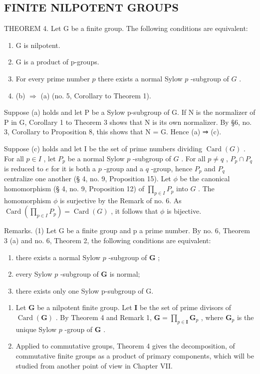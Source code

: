 \subsection{FINITE NILPOTENT GROUPS}

THEOREM 4. Let G be a finite group. The following conditions are equivalent:

\begin{enumerate}
\def\labelenumi{(\alph{enumi})}
\item
  G is nilpotent.
\item
  G is a product of p-groups.
\item
  For every prime number \(p\) there exists a normal Sylow \(p\) -subgroup of \(G\) .
\item
  (b) \(\Rightarrow\) (a) (no. 5, Corollary to Theorem 1).
\end{enumerate}

Suppose (a) holds and let P be a Sylow p-subgroup of G. If N is the normalizer of P in G, Corollary 1 to Theorem 3 shows that N is its own normalizer. By §6, no. 3, Corollary to Proposition 8, this shows that N = G. Hence (a) ⇒ (c).

Suppose (c) holds and let I be the set of prime numbers dividing \(\operatorname{Card}(G)\) . For all \(p \in I\) , let \(P_p\) be a normal Sylow \(p\) -subgroup of \(G\) . For all \(p \neq q\) , \(P_p \cap P_q\) is reduced to \(e\) for it is both a \(p\) -group and a \(q\) -group, hence \(P_p\) and \(P_q\) centralize one another (§ 4, no. 9, Proposition 15). Let \(\phi\) be the canonical homomorphism (§ 4, no. 9, Proposition 12) of \(\prod_{p \in I} P_p\) into \(G\) . The homomorphism \(\phi\) is surjective by the Remark of no. 6. As \(\operatorname{Card}\left(\prod_{p \in I} P_p\right) = \operatorname{Card}(G)\) , it follows that \(\phi\) is bijective.

Remarks. (1) Let G be a finite group and p a prime number. By no. 6, Theorem 3 (a) and no. 6, Theorem 2, the following conditions are equivalent:

\begin{enumerate}
\def\labelenumi{(\roman{enumi})}
\item
  there exists a normal Sylow \(p\) -subgroup of \(\mathbf{G}\) ;
\item
  every Sylow \(p\) -subgroup of \(\mathbf{G}\) is normal;
\item
  there exists only one Sylow p-subgroup of G.
\end{enumerate}

\begin{enumerate}
\def\labelenumi{(\arabic{enumi})}
\setcounter{enumi}{1}
\item
  Let \(\mathbf{G}\) be a nilpotent finite group. Let \(\mathbf{I}\) be the set of prime divisors of \(\operatorname{Card}(\mathbf{G})\) . By Theorem 4 and Remark 1, \(\mathbf{G} = \prod_{p \in \mathbf{I}} \mathbf{G}_p\) , where \(\mathbf{G}_p\) is the unique Sylow \(p\) -group of \(\mathbf{G}\) .
\item
  Applied to commutative groups, Theorem 4 gives the decomposition, of commutative finite groups as a product of primary components, which will be studied from another point of view in Chapter VII.
\end{enumerate}

